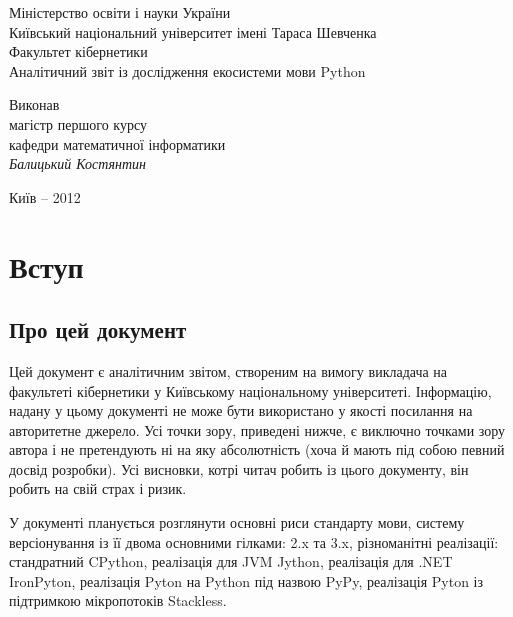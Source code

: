 \documentclass[a4paper, 12pt, onsedie]{article}
\begin{document}
\begin{titlepage}
    \begin{center}
        \normalsize{
            Міністерство освіти і науки України\\
            Київський національний університет імені Тараса Шевченка\\
            Факультет кібернетики\\[4.0cm]
        }
        \Huge{Аналітичний звіт із дослідження екосистеми мови Python}\\[9.0cm]
        \large{
            \begin{flushright}
                \parbox[position=right]{230px}{
                    Виконав\\
                    магістр першого курсу\\
                    кафедри математичної інформатики\\
                    \textit{Балицький Костянтин}
                }
            \end{flushright}
        }

        \vfill{\normalsize{Київ -- 2012}}
    \end{center}
\end{titlepage}

\tableofcontents
\pagebreak

\section{Вступ}

\subsection{Про цей документ}

    Цей документ є аналітичним звітом, створеним на вимогу викладача на факультеті кібернетики у Київському
    національному університеті. Інформацію, надану у цьому документі не може бути використано у якості посилання на
    авторитетне джерело. Усі точки зору, приведені нижче, є виключно точками зору автора і не претендують ні на яку
    абсолютність (хоча й мають під собою певний досвід розробки). Усі висновки, котрі читач робить із цього
    документу, він робить на свій страх і ризик.

    У документі планується розглянути основні риси стандарту мови, систему версіонування із її двома основними
    гілками: 2.x та 3.x, різноманітні реалізації: стандратний CPython, реалізація для JVM Jython, реалізація для 
    .NET IronPyton, реалізація Pyton на Python під назвою PyPy, реалізація Pyton із підтримкою мікропотоків Stackless.
    
\end{document}

